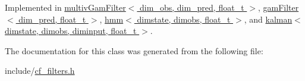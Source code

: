 Implemented in \hyperlink{classmultivGamFilter_ae32c76dd1096041f358962f93de64a99}{multiv\+Gam\+Filter$<$ dim\+\_\+obs, dim\+\_\+pred, float\+\_\+t $>$}, \hyperlink{classgamFilter_a8849fcc87e594367865c14767b8849e8}{gam\+Filter$<$ dim\+\_\+pred, float\+\_\+t $>$}, \hyperlink{classhmm_a588f2aed002614e75f523213eba1b290}{hmm$<$ dimstate, dimobs, float\+\_\+t $>$}, and \hyperlink{classkalman_aaf359a2d65f4f0ae8eb26603205b6f9b}{kalman$<$ dimstate, dimobs, diminput, float\+\_\+t $>$}.



The documentation for this class was generated from the following file\+:\begin{DoxyCompactItemize}
\item 
include/\hyperlink{cf__filters_8h}{cf\+\_\+filters.\+h}\end{DoxyCompactItemize}
